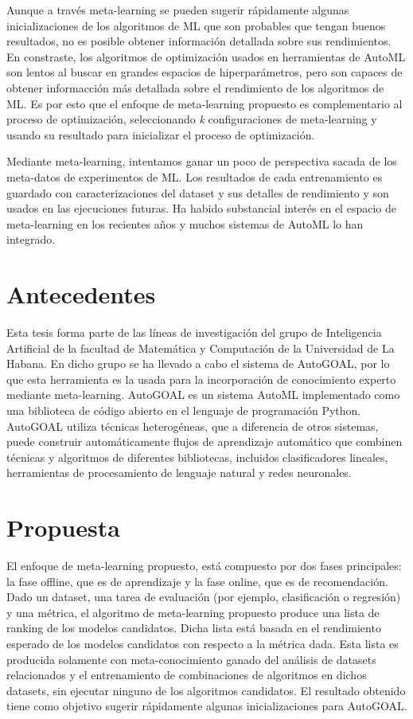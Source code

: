 Aunque a través meta-learning se pueden sugerir rápidamente algunas inicializaciones de los algoritmos de ML que son probables que tengan buenos resultados, no es posible obtener información detallada sobre sus rendimientos. En constraste, los algoritmos de optimización usados en herramientas de AutoML son lentos al buscar en grandes espacios de hiperparámetros, pero son capaces de obtener informacción más detallada sobre el rendimiento de los algoritmos de ML. Es por esto que el enfoque de meta-learning propuesto es complementario al proceso de optimización, seleccionando \textit{k} configuraciones de meta-learning y usando su resultado para inicializar el proceso de optimización.

Mediante meta-learning, intentamos ganar un poco de perspectiva sacada de los meta-datos de experimentos de ML. Los resultados de cada entrenamiento es guardado con caracterizaciones del dataset y sus detalles de rendimiento y son usados en las ejecuciones futuras. Ha habido substancial interés en el espacio de meta-learning en los recientes años y muchos sistemas de AutoML lo han integrado.

\section*{Antecedentes}

Esta tesis forma parte de las líneas de investigación del grupo de Inteligencia Artificial de la facultad de Matemática y Computación de la Universidad de La Habana. En dicho grupo se ha llevado a cabo el sistema de AutoGOAL,  por lo que esta herramienta es la usada para la incorporación de conocimiento experto mediante meta-learning. AutoGOAL es un sistema AutoML implementado como una biblioteca de código abierto en el lenguaje de programación Python. AutoGOAL utiliza técnicas heterogéneas, que a diferencia de otros sistemas, puede construir automáticamente flujos de aprendizaje automático que combinen técnicas y algoritmos de diferentes bibliotecas, incluidos clasificadores lineales, herramientas de procesamiento de lenguaje natural y redes neuronales.

\section*{Propuesta}

El enfoque de meta-learning propuesto, está compuesto por dos fases principales: la fase offline, que es de aprendizaje y la fase online, que es de recomendación. Dado un dataset, una tarea de evaluación (por ejemplo, clasificación o regresión) y una métrica, el algoritmo de meta-learning propuesto produce una lista de ranking de los modelos candidatos. Dicha lista está basada en el rendimiento esperado de los modelos candidatos con respecto a la métrica dada. Esta lista es producida solamente con meta-conocimiento ganado del análisis de datasets relacionados y el entrenamiento de combinaciones de algoritmos en dichos datasets, sin ejecutar ninguno de los algoritmos candidatos. El resultado obtenido tiene como objetivo sugerir rápidamente algunas inicializaciones para AutoGOAL.

